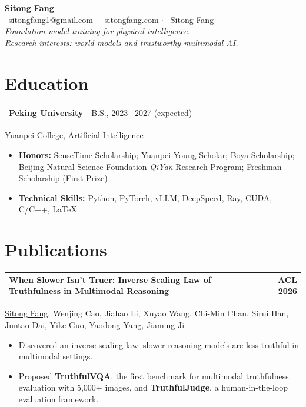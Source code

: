 \documentclass[11pt,a4paper]{article}
\makeatletter
\newcommand{\me}{\uline{Sitong Fang}}
\newcommand{\pubentry}[3]{%
  \Needspace{5\baselineskip}%
  \noindent\begin{tabularx}{\textwidth}{@{}>{\raggedright\arraybackslash}X r@{}}
    \textbf{#1} & #2\enspace\href{#3}{\faFilePdf} \\
  \end{tabularx}\vspace{-2pt}%
}
\newcommand{\cventry}[2]{%
  \Needspace{4\baselineskip}%
  \noindent\begin{tabularx}{\textwidth}{@{}X r@{}}
    \textbf{#1} & {#2} \\
  \end{tabularx}\vspace{-2pt}%
}
\newcommand{\venue}[1]{%
  \colorbox{gray!15}{\small\textbf{#1}}%
}
\makeatother
\begin{document}
\begin{center}
  {\LARGE\bfseries Sitong Fang} \\[5pt]
  \faEnvelope~\href{mailto:sitongfang1@gmail.com}{sitongfang1@gmail.com}
  \quad$\cdot$\quad
  \faGlobe~\href{https://sitongfang.com}{sitongfang.com}
  \quad$\cdot$\quad
  \faGithub~\href{https://github.com/Lavezlyn}{Sitong Fang}
  \\[4pt]
  \textit{Foundation model training for physical intelligence.\\ Research interests: world models and trustworthy multimodal AI.}
\end{center}

\vspace{-0.4em}

\section{Education}

\cventry{Peking University}{B.S., 2023\,--\,2027 (expected)}
\noindent Yuanpei College, Artificial Intelligence \\[2pt]
\begin{itemize}
  \item \textbf{Honors:} SenseTime Scholarship; Yuanpei Young Scholar; Boya Scholarship; Beijing Natural Science Foundation \textit{QiYan} Research Program; Freshman Scholarship (First Prize)
  \item \textbf{Technical Skills:} Python, PyTorch, vLLM, DeepSpeed, Ray, CUDA, C/C++, \LaTeX
\end{itemize}

\section{Publications}

\pubentry{When Slower Isn't Truer: Inverse Scaling Law of Truthfulness in Multimodal Reasoning}{\venue{ACL 2026}}{https://arxiv.org/abs/2505.20214}
\me{}, Wenjing Cao, Jiahao Li, Xuyao Wang, Chi-Min Chan, Sirui Han, Juntao Dai, Yike Guo, Yaodong Yang, Jiaming Ji
\begin{itemize}
  \item Discovered an inverse scaling law: slower reasoning models are less truthful in multimodal settings.
  \item Proposed \textbf{TruthfulVQA}, the first benchmark for multimodal truthfulness evaluation with 5,000+ images, and \textbf{TruthfulJudge}, a human-in-the-loop evaluation framework.
\end{itemize}
\end{document}
